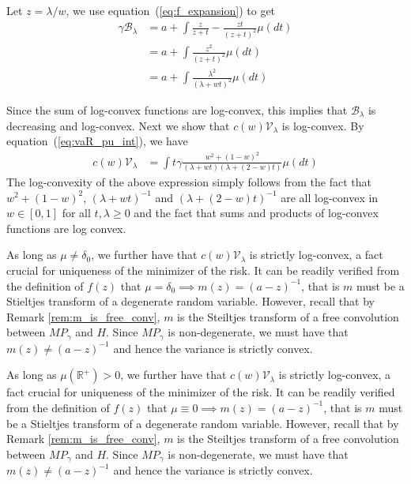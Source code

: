 \documentclass[10pt]{article}
\def\eqref#1{equation~(\ref{#1})}
\newcommand{\mv}{\mathcal{V}}
\numberwithin{thm}{section}
\numberwithin{remark}{section}
\numberwithin{ex}{section}
\numberwithin{ass}{section}
\numberwithin{defn}{section}
\numberwithin{lemma}{section}
\numberwithin{corollary}{section}
\numberwithin{prop}{section}
\newcommand{\rr}{\mathbb{R}}
\newcommand{\mb}{\mathcal{B}}
\numberwithin{equation}{section}
\begin{document}
Let $z=\lambda/w$, we use \eqref{eq:f_expansion} to get
\begin{align}
\gamma \mb_\lambda &= a + \int \frac{z}{z+t} - \frac{zt}{(z+t)^2} \mu(dt) \nonumber\\
&= a + \int \frac{z^2}{(z+t)^2} \mu(dt) \nonumber\\
\label{eq:bias_mu_int} &= a + \int \frac{\lambda^2}{(\lambda+wt)^2} \mu(dt)
\end{align}

Since the sum of log-convex functions are log-convex, this implies that $\mathcal{B}_{\lambda}$ is decreasing and log-convex. Next we show that $c(w) \mv_\lambda$ is log-convex.
By \eqref{eq:vaR_pu_int}, we have
\begin{align*}
c(w) \mv_\lambda &= \int t\gamma \frac{w^2 + (1-w)^2}{(\lambda+wt)(\lambda+(2-w)t)} \mu(dt)
\end{align*}
The log-convexity of the above expression simply follows from the fact that $w^2+(1-w)^2$, $(\lambda+wt)^{-1}$ and $(\lambda + (2-w)t)^{-1}$ are all log-convex in $w\in[0,1]$ for all $t,\lambda \ge 0$ and the fact that sums and products of log-convex functions are log convex.

As long as $\mu \not = \delta_0$, we further have that $c(w)\mv_\lambda$ is strictly log-convex, a fact crucial for uniqueness of the minimizer of the risk.
It can be readily verified from the definition of $f(z)$ that $\mu = \delta_0 \implies m(z) = (a-z)^{-1}$, that is $m$ must be a Stieltjes transform of a degenerate random variable. However, recall that by Remark \ref{rem:m_is_free_conv}, $m$ is the Steiltjes transform of a free convolution between $MP_\gamma$ and $H$. Since $MP_\gamma$ is non-degenerate, we must have that $m(z)\ne (a-z)^{-1}$ and hence the variance is strictly convex.

As long as $\mu(\rr^+) > 0$, we further have that $c(w)\mv_\lambda$ is strictly log-convex, a fact crucial for uniqueness of the minimizer of the risk.
It can be readily verified from the definition of $f(z)$ that $\mu \equiv 0 \implies m(z) = (a-z)^{-1}$, that is $m$ must be a Stieltjes transform of a degenerate random variable. However, recall that by Remark \ref{rem:m_is_free_conv}, $m$ is the Steiltjes transform of a free convolution between $MP_\gamma$ and $H$. Since $MP_\gamma$ is non-degenerate, we must have that $m(z)\ne (a-z)^{-1}$ and hence the variance is strictly convex.
\end{document}
